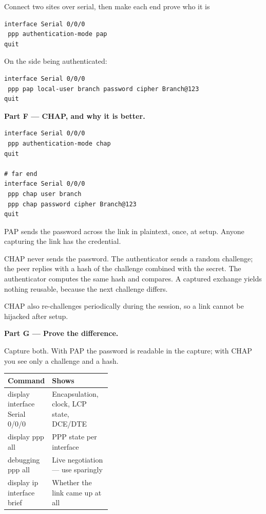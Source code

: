 \begin{labproject}{Connect two sites over serial, then make each end prove who it is}
\begin{lstlisting}[style=dcnterminal]
interface Serial 0/0/0
 ppp authentication-mode pap
quit
\end{lstlisting}

On the side being authenticated:

\begin{lstlisting}[style=dcnterminal]
interface Serial 0/0/0
 ppp pap local-user branch password cipher Branch@123
quit
\end{lstlisting}

\medskip\noindent\textbf{Part F --- CHAP, and why it is better.}\par

\begin{lstlisting}[style=dcnterminal]
interface Serial 0/0/0
 ppp authentication-mode chap
quit

# far end
interface Serial 0/0/0
 ppp chap user branch
 ppp chap password cipher Branch@123
quit
\end{lstlisting}

\begin{keyidea}
PAP sends the password across the link in plaintext, once, at setup. Anyone capturing the link has the credential.

CHAP never sends the password. The authenticator sends a random challenge; the peer replies with a hash of the challenge combined with the secret. The authenticator computes the same hash and compares. A captured exchange yields nothing reusable, because the next challenge differs.

CHAP also re-challenges periodically during the session, so a link cannot be hijacked after setup.
\end{keyidea}

\medskip\noindent\textbf{Part G --- Prove the difference.}\par
Capture both. With PAP the password is readable in the capture; with CHAP you see only a challenge and a hash.

\begin{commandmap}
\begin{tabularx}{\linewidth}{@{}>{\ttfamily}p{0.40\linewidth}X@{}}
\toprule
\rowcolor{MLPaleBlue!92}
\textrm{\bfseries Command} & \bfseries Shows \\
\midrule
display interface Serial 0/0/0 & Encapsulation, clock, LCP state, DCE/DTE \\
display ppp all & PPP state per interface \\
debugging ppp all & Live negotiation --- use sparingly \\
display ip interface brief & Whether the link came up at all \\
\bottomrule
\end{tabularx}
\end{commandmap}


\end{labproject}
